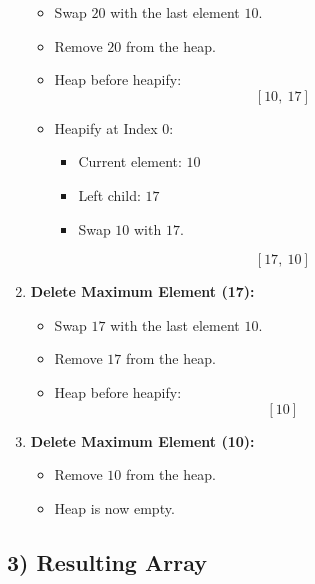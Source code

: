 \documentclass{cs1204}
\begin{document}
\begin{enumerate}[label=\textbf{\arabic*.}]
    \begin{itemize}
        \item Swap \(20\) with the last element \(10\).
        \item Remove \(20\) from the heap.
        \item Heap before heapify:
        \[
        [10, \ 17]
        \]
        \item Heapify at Index 0:
        \begin{itemize}
            \item Current element: \(10\)
            \item Left child: \(17\)
            \item Swap \(10\) with \(17\).
        \end{itemize}
        \[
        [17, \ 10]
        \]
    \end{itemize}
    \item \textbf{Delete Maximum Element (17):}
    \begin{itemize}
        \item Swap \(17\) with the last element \(10\).
        \item Remove \(17\) from the heap.
        \item Heap before heapify:
        \[
        [10]
        \]
    \end{itemize}
    \item \textbf{Delete Maximum Element (10):}
    \begin{itemize}
        \item Remove \(10\) from the heap.
        \item Heap is now empty.
    \end{itemize}
\end{enumerate}

\subsection*{3) Resulting Array}
\end{document}
